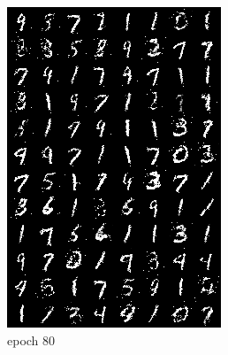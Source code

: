 \documentclass[a4paper]{article}
\theoremstyle{definition}
\begin{document}
\begin{enumerate} [label=(\alph*)]
\begin{figure}[H]
\begin{subfigure}[b]{0.28\textwidth}
				\includegraphics[width=\textwidth]{gen_img80.png}
				\caption{epoch 80}
			\end{subfigure}
			\hfill
			\begin{subfigure}[b]{0.28\textwidth}
				\centering

\end{subfigure}
\end{figure}
\end{enumerate}
\end{document}
